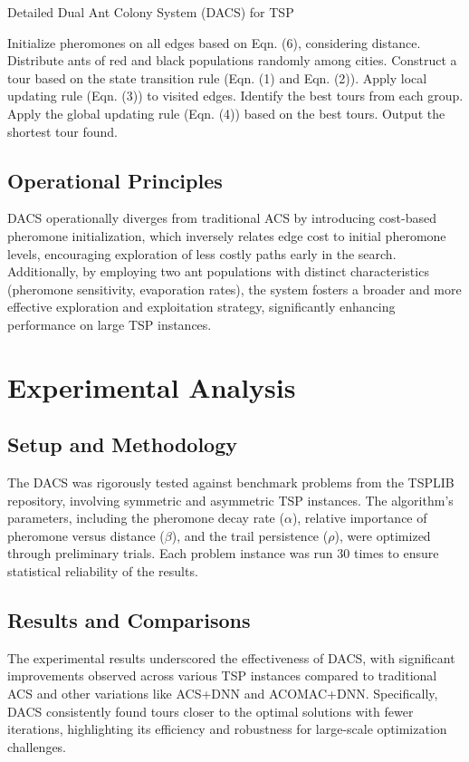 \begin{algorithm}
	\caption{Detailed Dual Ant Colony System (DACS) for TSP}
	\begin{algorithmic}[1]
		\State Initialize pheromones on all edges based on Eqn. (6), considering distance.
		\State Distribute ants of red and black populations randomly among cities.
		\Repeat
		\State Construct a tour based on the state transition rule (Eqn. (1) and Eqn. (2)).
		\State Apply local updating rule (Eqn. (3)) to visited edges.
		\EndFor
		\EndFor
		\State Identify the best tours from each group.
		\State Apply the global updating rule (Eqn. (4)) based on the best tours.
		\State Output the shortest tour found.
	\end{algorithmic}
\end{algorithm}

\subsection{Operational Principles}
DACS operationally diverges from traditional ACS by introducing cost-based pheromone initialization, which inversely relates edge cost to initial pheromone levels, encouraging exploration of less costly paths early in the search. Additionally, by employing two ant populations with distinct characteristics (pheromone sensitivity, evaporation rates), the system fosters a broader and more effective exploration and exploitation strategy, significantly enhancing performance on large TSP instances.

\section{Experimental Analysis}

\subsection{Setup and Methodology}
The DACS was rigorously tested against benchmark problems from the TSPLIB repository, involving symmetric and asymmetric TSP instances. The algorithm's parameters, including the pheromone decay rate ($\alpha$), relative importance of pheromone versus distance ($\beta$), and the trail persistence ($\rho$), were optimized through preliminary trials. Each problem instance was run 30 times to ensure statistical reliability of the results.

\subsection{Results and Comparisons}
The experimental results underscored the effectiveness of DACS, with significant improvements observed across various TSP instances compared to traditional ACS and other variations like ACS+DNN and ACOMAC+DNN. Specifically, DACS consistently found tours closer to the optimal solutions with fewer iterations, highlighting its efficiency and robustness for large-scale optimization challenges.

